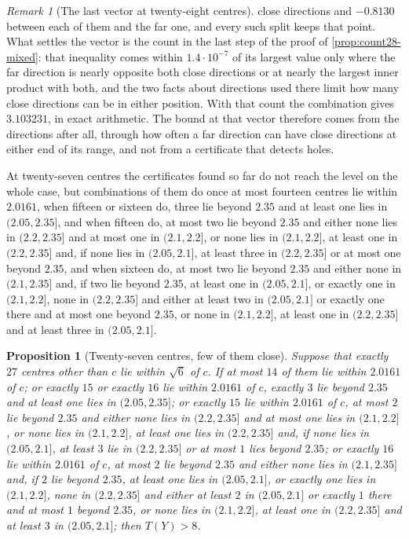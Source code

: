 \documentclass[11pt,reqno]{amsart}
\renewcommand{\_}{\origunderscore\allowbreak}
\numberwithin{equation}{section}
\theoremstyle{plain}
\newtheorem{prop}[thm]{Proposition}
\theoremstyle{definition}
\theoremstyle{remark}
\newtheorem{remark}[thm]{Remark}
\begin{document}
\begin{remark}[The last vector at twenty-eight centres]
close directions and $-0.8130$ between each of them and the far one, and
every such split keeps that point. What settles the vector is the count in
the last step of the proof of \cref{prop:count28-mixed}: that inequality
comes within $1.4\cdot10^{-7}$ of its largest value only where the far
direction is nearly opposite both close directions or at nearly the
largest inner product with both, and the two facts about directions used
there limit how many close directions can be in either position. With
that count the combination gives $3.103231$, in exact arithmetic. The bound at that vector therefore comes
from the directions after all, through how often a far direction can have
close directions at either end of its range, and not from a certificate
that detects holes.
\end{remark}

At twenty-seven centres the certificates found so far do not reach the
level on the whole case, but combinations of them do once at most fourteen
centres lie within $2.0161$, when fifteen or sixteen do, three lie
beyond $2.35$ and at least one lies in $(2.05,2.35]$, and when fifteen do,
at most two lie beyond $2.35$ and either none lies in $(2.2,2.35]$ and at most one in $(2.1,2.2]$, or none lies in $(2.1,2.2]$, at least one in $(2.2,2.35]$ and, if none lies in $(2.05,2.1]$, at least three in $(2.2,2.35]$ or at most one beyond $2.35$,
and when sixteen do, at most two lie beyond $2.35$ and either none in $(2.1,2.35]$ and, if two lie beyond $2.35$, at least one in $(2.05,2.1]$, or exactly one in $(2.1,2.2]$, none in $(2.2,2.35]$ and either at least two in $(2.05,2.1]$ or exactly one there and at most one beyond $2.35$, or none in $(2.1,2.2]$, at least one in $(2.2,2.35]$ and at least three in $(2.05,2.1]$.

\begin{prop}[Twenty-seven centres, few of them close]\label{prop:count27-few}
Suppose that exactly $27$ centres other than $c$ lie within $\sqrt6$ of $c$.
If at most $14$ of them lie within $2.0161$ of $c$; or exactly $15$ or
exactly $16$ lie within $2.0161$ of $c$, exactly $3$ lie beyond $2.35$ and
at least one lies in $(2.05,2.35]$; or exactly $15$ lie within $2.0161$ of
$c$, at most $2$ lie beyond $2.35$ and either none lies in $(2.2,2.35]$ and at most
one lies in $(2.1,2.2]$, or none lies in $(2.1,2.2]$, at least one lies in $(2.2,2.35]$ and, if none lies in $(2.05,2.1]$, at least $3$ lie in $(2.2,2.35]$ or at most $1$ lies beyond $2.35$; or exactly $16$ lie within $2.0161$ of $c$, at
most $2$ lie beyond $2.35$ and either none lies in $(2.1,2.35]$ and, if
$2$ lie beyond $2.35$, at least one lies in $(2.05,2.1]$, or exactly one lies in $(2.1,2.2]$, none in $(2.2,2.35]$
and either at least $2$ in $(2.05,2.1]$ or exactly $1$ there and at most $1$ beyond $2.35$, or none lies in $(2.1,2.2]$, at least
one in $(2.2,2.35]$ and at least $3$ in $(2.05,2.1]$; then $T(Y)>8$.
\end{prop}
\end{document}
